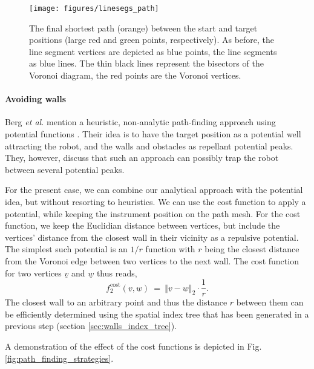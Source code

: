 \begin{figure}[h]
	\begin{center}
		\texttt{[image: figures/linesegs\_path]}
	\end{center}
	\caption[Path between a start and a target position.]{
		The final shortest path (orange) between the start and target positions (large red and green points, respectively).
		As before, the line segment vertices are depicted as blue points, the line segments as blue lines.
		The thin black lines represent the bisectors of the Voronoi diagram, the red points are the Voronoi vertices.
		\label{fig:linesegs_path}}
\end{figure}


\paragraph{Avoiding walls}
Berg \textit{et al.} mention a heuristic, non-analytic path-finding approach using potential 
functions \cite[p. 305]{Berg2008}. Their idea is to have the target position as a potential well attracting
the robot, and the walls and obstacles as repellant potential peaks. They, however, discuss
that such an approach can possibly trap the robot between several potential peaks.

For the present case, we can combine our analytical approach with the potential idea, but without 
resorting to heuristics. We can use the cost function to apply a potential, while keeping the
instrument position on the path mesh.
For the cost function, we keep the Euclidian distance between vertices, but include the vertices' 
distance from the closest wall in their vicinity as a repulsive potential. 
The simplest such potential is an $1/r$ function with $r$ being the closest distance from the 
Voronoi edge between two vertices to the next wall.
The cost function for two vertices $\underline{v}$ and $\underline{w}$ thus reads,
\begin{equation}
	f^{\mathrm{cost}}_2\left(\underline{v}, \underline{w} \right) \ = \ 
	\left\Vert \underline{v} - \underline{w} \right\Vert_2 \cdot \frac{1}{r}.
\end{equation}
The closest wall to an arbitrary point and thus the distance $r$ between them can be efficiently
determined using the spatial index tree that has been generated in a previous step
(section \ref{sec:walls_index_tree}).

A demonstration of the effect of the cost functions is depicted in Fig. \ref{fig:path_finding_strategies}.


